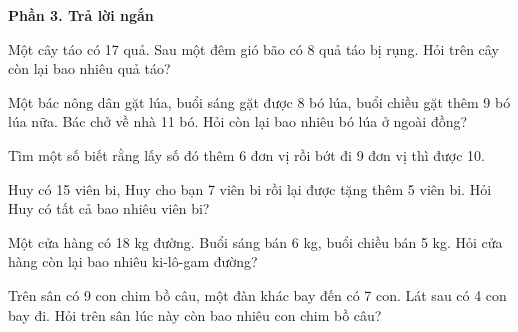 \textbf{Phần 3. Trả lời ngắn}

\begin{ex} %
Một cây táo có 17 quả. Sau một đêm gió bão có 8 quả táo bị rụng. Hỏi trên cây còn lại bao nhiêu quả táo?
\end{ex}

\begin{ex} %
Một bác nông dân gặt lúa, buổi sáng gặt được 8 bó lúa, buổi chiều gặt thêm 9 bó lúa nữa. Bác chở về nhà 11 bó. Hỏi còn lại bao nhiêu bó lúa ở ngoài đồng?
\end{ex}

\begin{ex} %
Tìm một số biết rằng lấy số đó thêm 6 đơn vị rồi bớt đi 9 đơn vị thì được 10.
\end{ex}

\begin{ex} %
Huy có 15 viên bi, Huy cho bạn 7 viên bi rồi lại được tặng thêm 5 viên bi. Hỏi Huy có tất cả bao nhiêu viên bi?
\end{ex}

\begin{ex} %
Một cửa hàng có 18 kg đường. Buổi sáng bán 6 kg, buổi chiều bán 5 kg. Hỏi cửa hàng còn lại bao nhiêu ki-lô-gam đường?
\end{ex}

\begin{ex} %
Trên sân có 9 con chim bồ câu, một đàn khác bay đến có 7 con. Lát sau có 4 con bay đi. Hỏi trên sân lúc này còn bao nhiêu con chim bồ câu?
\end{ex}
